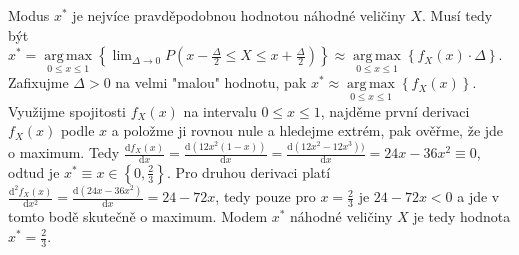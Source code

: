 ﻿\documentclass{article}
\DeclareMathOperator*{\argmax}{arg\,max}
\begin{document}
\begin{enumerate}[1)]
Modus $x^{*}$ je nejvíce pravděpodobnou hodnotou náhodné veličiny $X$. Musí tedy být $x^{*} = \argmax\limits_{0 \leq x \leq 1} \left\{ \lim_{\Delta \to 0} P\left(x - \frac{\Delta}{2} \leq X \leq x + \frac{\Delta}{2}\right) \right\} \approx \argmax\limits_{0 \leq x \leq 1} \left\{ f_{X}(x) \cdot \Delta \right\}$. Zafixujme $\Delta > 0$ na velmi "malou" hodnotu, pak $x^{*} \approx \argmax\limits_{0 \leq x \leq 1} \left\{ f_{X}(x) \right\}$. Využijme spojitosti $f_{X}(x)$ na intervalu $0 \leq x \leq 1$, najděme první derivaci $f_{X}(x)$ podle $x$ a položme ji rovnou nule a hledejme extrém, pak ověřme, že jde o maximum. Tedy $\frac{\text{d}f_{X}(x)}{\text{d}x} = \frac{\text{d}(12x^{2}(1 - x))}{\text{d}x} = \frac{\text{d}(12x^{2} - 12x^{3}))}{\text{d}x} = 24x - 36x^{2} \equiv 0$, odtud je $x^{*} \equiv x \in \left\{ 0, \frac{2}{3} \right\}$. Pro druhou derivaci platí $\frac{\text{d}^{2} f_{X}(x)}{\text{d}x^{2}} = \frac{\text{d}(24x - 36x^{2})}{\text{d}x} = 24 - 72x$, tedy pouze pro $x = \frac{2}{3}$ je $24 - 72x < 0$ a jde v tomto bodě skutečně o maximum. Modem $x^{*}$ náhodné veličiny $X$ je tedy hodnota $x^{*} = \frac{2}{3}$.


\end{enumerate}
\end{document}
